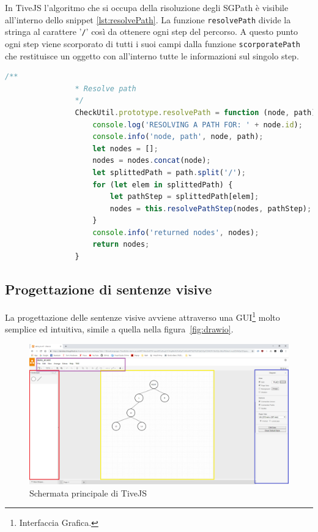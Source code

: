             In TiveJS l'algoritmo che si occupa della risoluzione degli SGPath è visibile all'interno dello snippet \ref{lst:resolvePath}. La funzione \texttt{resolvePath} divide la stringa al carattere '\texttt{/}' così da ottenere ogni step del percorso. A questo punto ogni step viene scorporato di tutti i suoi campi dalla funzione \texttt{scorporatePath} che restituisce un oggetto con all'interno tutte le informazioni sul singolo step.
            \begin{lstlisting}[language=JavaScript,caption=\textbf{Funzione che si occupa della risoluzione delle path},label={lst:resolvePath}]
                /**
                * Resolve path
                */
                CheckUtil.prototype.resolvePath = function (node, path) {
                    console.log('RESOLVING A PATH FOR: ' + node.id);
                    console.info('node, path', node, path);
                    let nodes = [];
                    nodes = nodes.concat(node);
                    let splittedPath = path.split('/');
                    for (let elem in splittedPath) {
                        let pathStep = splittedPath[elem];
                        nodes = this.resolvePathStep(nodes, pathStep);
                    }
                    console.info('returned nodes', nodes);
                    return nodes;
                }
            \end{lstlisting}
        \newpage
        \subsection{Progettazione di sentenze visive}
            La progettazione delle sentenze visive avviene attraverso una GUI\footnote{Interfaccia Grafica.} molto semplice ed intuitiva, simile a quella nella figura~\ref{fig:drawio}.

            \begin{figure}[htbp]
                \centering
                \includegraphics[scale=0.25]{Figure/tivejs_gui2.png}
                \caption{Schermata principale di TiveJS}
                \label{fig:tivejsgui}
            \end{figure}

